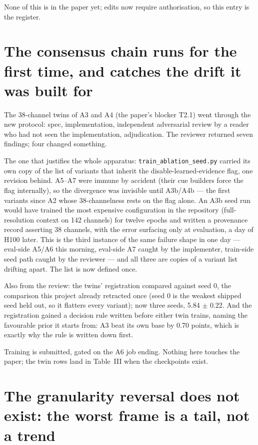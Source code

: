 \documentclass[11pt,a4paper]{article}
\begin{document}
None of this is in the paper yet; edits now require authorisation, so this
entry is the register.



\section*{The consensus chain runs for the first time, and catches the drift it was built for}

The 38-channel twins of A3 and A4 (the paper's blocker T2.1) went through the
new protocol: spec, implementation, independent adversarial review by a reader
who had not seen the implementation, adjudication. The reviewer returned seven
findings; four changed something.

The one that justifies the whole apparatus: \texttt{train\_ablation\_seed.py}
carried its own copy of the list of variants that inherit the
disable-learned-evidence flag, one revision behind. A5--A7 were immune by
accident (their cue builders force the flag internally), so the divergence was
invisible until A3b/A4b --- the first variants since A2 whose 38-channelness
rests on the flag alone. An A3b seed run would have trained the most expensive
configuration in the repository (full-resolution context on 142 channels) for
twelve epochs and written a provenance record asserting 38 channels, with the
error surfacing only at evaluation, a day of H100 later. This is the third
instance of the same failure shape in one day --- eval-side A5/A6 this
morning, eval-side A7 caught by the implementer, train-side seed path caught
by the reviewer --- and all three are copies of a variant list drifting apart.
The list is now defined once.

Also from the review: the twins' registration compared against seed 0, the
comparison this project already retracted once (seed 0 is the weakest shipped
seed held out, so it flatters every variant); now three seeds, 5.84 $\pm$
0.22. And the registration gained a decision rule written before either twin
trains, naming the favourable prior it starts from: A3 beat its own base by
0.70 points, which is exactly why the rule is written down first.

Training is submitted, gated on the A6 job ending. Nothing here touches the
paper; the twin rows land in Table~III when the checkpoints exist.



\section*{The granularity reversal does not exist: the worst frame is a tail, not a trend}
\end{document}
